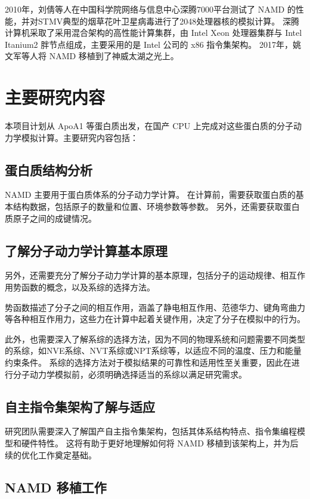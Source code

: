 2010年，刘倩等人在中国科学院网络与信息中心深腾7000平台测试了 NAMD 的性能，并对STMV典型的烟草花叶卫星病毒进行了2048处理器核的模拟计算\cite{刘倩2010基于深腾}。
深腾计算机采取了采用混合架构的高性能计算集群，由 Intel Xeon 处理器集群与 Intel Itanium2 胖节点组成，主要采用的是 Intel 公司的 x86 指令集架构。
2017年，姚文军\cite{姚文军2017基于神威太湖之光的}等人将 NAMD 移植到了神威太湖之光上。

\section{主要研究内容}

本项目计划从 ApoA1 等蛋白质出发，在国产 CPU 上完成对这些蛋白质的分子动力学模拟计算。主要研究内容包括：

\subsection{蛋白质结构分析}

NAMD 主要用于蛋白质体系的分子动力学计算。
在计算前，需要获取蛋白质的基本结构数据，包括原子的数量和位置、环境参数等参数。
另外，还需要获取蛋白质原子之间的成键情况。

\subsection{了解分子动力学计算基本原理}

另外，还需要充分了解分子动力学计算的基本原理，包括分子的运动规律、相互作用势函数的概念，以及系综的选择方法。

势函数描述了分子之间的相互作用，涵盖了静电相互作用、范德华力、键角弯曲力等各种相互作用力，这些力在计算中起着关键作用，决定了分子在模拟中的行为。

此外，也需要深入了解系综的选择方法，因为不同的物理系统和问题需要不同类型的系综，如NVE系综、NVT系综或NPT系综等，以适应不同的温度、压力和能量约束条件。
系综的选择方法对于模拟结果的可靠性和适用性至关重要，因此在进行分子动力学模拟前，必须明确选择适当的系综以满足研究需求。

\subsection{自主指令集架构了解与适应}

研究团队需要深入了解国产自主指令集架构，包括其体系结构特点、指令集编程模型和硬件特性。
这将有助于更好地理解如何将 NAMD 移植到该架构上，并为后续的优化工作奠定基础。

\subsection{NAMD 移植工作}

